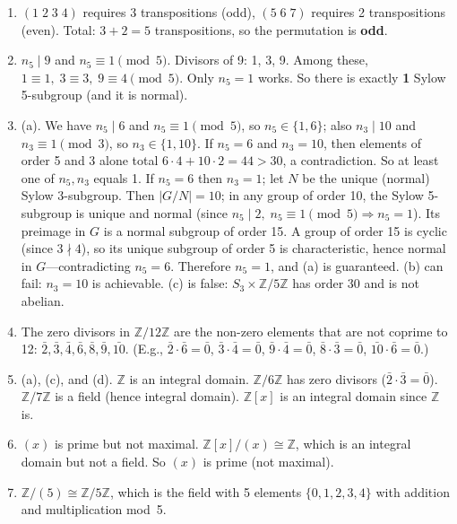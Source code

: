 \documentclass[11pt]{article}
\begin{document}
\begin{enumerate}
\item $(1\;2\;3\;4)$ requires 3 transpositions (odd), $(5\;6\;7)$ requires 2 transpositions (even). Total: $3+2=5$ transpositions, so the permutation is \textbf{odd}.

\item $n_5\mid 9$ and $n_5\equiv 1\pmod{5}$. Divisors of 9: 1, 3, 9. Among these, $1\equiv 1,\; 3\equiv 3,\; 9\equiv 4\pmod{5}$. Only $n_5=1$ works. So there is exactly \textbf{1} Sylow 5-subgroup (and it is normal).

\item (a). We have $n_5\mid 6$ and $n_5\equiv 1\pmod{5}$, so $n_5\in\{1,6\}$; also $n_3\mid 10$ and $n_3\equiv 1\pmod{3}$, so $n_3\in\{1,10\}$. If $n_5=6$ and $n_3=10$, then elements of order 5 and 3 alone total $6\cdot 4+10\cdot 2=44>30$, a contradiction. So at least one of $n_5,n_3$ equals 1. If $n_5=6$ then $n_3=1$; let $N$ be the unique (normal) Sylow 3-subgroup. Then $|G/N|=10$; in any group of order 10, the Sylow 5-subgroup is unique and normal (since $n_5\mid 2,\;n_5\equiv 1\pmod{5}\Rightarrow n_5=1$). Its preimage in $G$ is a normal subgroup of order 15. A group of order 15 is cyclic (since $3\nmid 4$), so its unique subgroup of order 5 is characteristic, hence normal in $G$---contradicting $n_5=6$. Therefore $n_5=1$, and (a) is guaranteed. (b) can fail: $n_3=10$ is achievable. (c) is false: $S_3\times\mathbb{Z}/5\mathbb{Z}$ has order 30 and is not abelian.

\item The zero divisors in $\mathbb{Z}/12\mathbb{Z}$ are the non-zero elements that are not coprime to 12: $\bar{2}, \bar{3}, \bar{4}, \bar{6}, \bar{8}, \bar{9}, \bar{10}$. (E.g., $\bar{2}\cdot\bar{6}=\bar{0}$, $\bar{3}\cdot\bar{4}=\bar{0}$, $\bar{9}\cdot\bar{4}=\bar{0}$, $\bar{8}\cdot\bar{3}=\bar{0}$, $\bar{10}\cdot\bar{6}=\bar{0}$.)

\item (a), (c), and (d). $\mathbb{Z}$ is an integral domain. $\mathbb{Z}/6\mathbb{Z}$ has zero divisors ($\bar{2}\cdot\bar{3}=\bar{0}$). $\mathbb{Z}/7\mathbb{Z}$ is a field (hence integral domain). $\mathbb{Z}[x]$ is an integral domain since $\mathbb{Z}$ is.

\item $(x)$ is prime but not maximal. $\mathbb{Z}[x]/(x)\cong\mathbb{Z}$, which is an integral domain but not a field. So $(x)$ is prime (not maximal).

\item $\mathbb{Z}/(5)\cong\mathbb{Z}/5\mathbb{Z}$, which is the field with 5 elements $\{0,1,2,3,4\}$ with addition and multiplication mod~5.


\end{enumerate}
\end{document}
